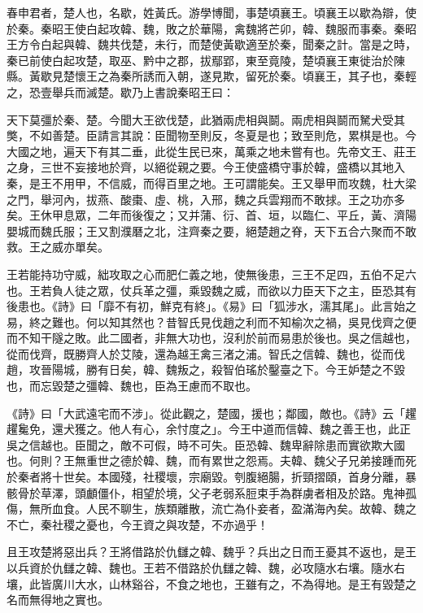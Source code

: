 
\begin{pinyinscope}
春申君者，楚人也，名歇，姓黃氏。游學博聞，事楚頃襄王。頃襄王以歇為辯，使於秦。秦昭王使白起攻韓、魏，敗之於華陽，禽魏將芒卯，韓、魏服而事秦。秦昭王方令白起與韓、魏共伐楚，未行，而楚使黃歇適至於秦，聞秦之計。當是之時，秦已前使白起攻楚，取巫、黔中之郡，拔鄢郢，東至竟陵，楚頃襄王東徙治於陳縣。黃歇見楚懷王之為秦所誘而入朝，遂見欺，留死於秦。頃襄王，其子也，秦輕之，恐壹舉兵而滅楚。歇乃上書說秦昭王曰：

天下莫彊於秦、楚。今聞大王欲伐楚，此猶兩虎相與鬬。兩虎相與鬬而駑犬受其獘，不如善楚。臣請言其說：臣聞物至則反，冬夏是也；致至則危，累棋是也。今大國之地，遍天下有其二垂，此從生民已來，萬乘之地未嘗有也。先帝文王、莊王之身，三世不妄接地於齊，以絕從親之要。今王使盛橋守事於韓，盛橋以其地入秦，是王不用甲，不信威，而得百里之地。王可謂能矣。王又舉甲而攻魏，杜大梁之門，舉河內，拔燕、酸棗、虛、桃，入邢，魏之兵雲翔而不敢捄。王之功亦多矣。王休甲息眾，二年而後復之；又并蒲、衍、首、垣，以臨仁、平丘，黃、濟陽嬰城而魏氏服；王又割濮磿之北，注齊秦之要，絕楚趙之脊，天下五合六聚而不敢救。王之威亦單矣。

王若能持功守威，絀攻取之心而肥仁義之地，使無後患，三王不足四，五伯不足六也。王若負人徒之眾，仗兵革之彊，乘毀魏之威，而欲以力臣天下之主，臣恐其有後患也。《詩》曰「靡不有初，鮮克有終」。《易》曰「狐涉水，濡其尾」。此言始之易，終之難也。何以知其然也？昔智氏見伐趙之利而不知榆次之禍，吳見伐齊之便而不知干隧之敗。此二國者，非無大功也，沒利於前而易患於後也。吳之信越也，從而伐齊，既勝齊人於艾陵，還為越王禽三渚之浦。智氏之信韓、魏也，從而伐趙，攻晉陽城，勝有日矣，韓、魏叛之，殺智伯瑤於鑿臺之下。今王妒楚之不毀也，而忘毀楚之彊韓、魏也，臣為王慮而不取也。

《詩》曰「大武遠宅而不涉」。從此觀之，楚國，援也；鄰國，敵也。《詩》云「趯趯毚免，還犬獲之。他人有心，余忖度之」。今王中道而信韓、魏之善王也，此正吳之信越也。臣聞之，敵不可假，時不可失。臣恐韓、魏卑辭除患而實欲欺大國也。何則？王無重世之德於韓、魏，而有累世之怨焉。夫韓、魏父子兄弟接踵而死於秦者將十世矣。本國殘，社稷壞，宗廟毀。刳腹絕腸，折頸摺頤，首身分離，暴骸骨於草澤，頭顱僵仆，相望於境，父子老弱系脰束手為群虜者相及於路。鬼神孤傷，無所血食。人民不聊生，族類離散，流亡為仆妾者，盈滿海內矣。故韓、魏之不亡，秦社稷之憂也，今王資之與攻楚，不亦過乎！

且王攻楚將惡出兵？王將借路於仇讎之韓、魏乎？兵出之日而王憂其不返也，是王以兵資於仇讎之韓、魏也。王若不借路於仇讎之韓、魏，必攻隨水右壤。隨水右壤，此皆廣川大水，山林谿谷，不食之地也，王雖有之，不為得地。是王有毀楚之名而無得地之實也。


\end{pinyinscope}
